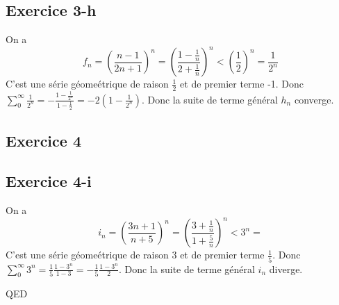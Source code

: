 \documentclass[]{book}
\theoremstyle{definition}
\begin{document}
\subsection*{Exercice 3-h}
On a 
$$f_n = \left( \frac{n-1}{2n+1} \right)^n = \left( \frac{1-\frac{1}{n}}{2+\frac{1}{n}} \right)^n < \left( \frac{1}{2} \right)^n = \frac{1}{2^n}$$
C'est une s\'erie g\'eome\'etrique de raison $\frac{1}{2}$ et de premier terme -1. Donc $\sum_{0}^{\infty}\frac{1}{2^n} = -\frac{1-\frac{1}{2^n}}{1-\frac{1}{2}} = -2(1-\frac{1}{2^n})$. Donc la suite de terme g\'en\'eral $h_n$ converge.

\subsection*{Exercice 4}
\subsection*{Exercice 4-i}
On a 
$$i_n = \left( \frac{3n+1}{n+5} \right)^n = \left( \frac{3+\frac{1}{n}}{1+\frac{5}{n}} \right)^n < 3^n = $$
C'est une s\'erie g\'eome\'etrique de raison $3$ et de premier terme $\frac{1}{5}$. Donc $\sum_{0}^{\infty} 3^n = \frac{1}{5}\frac{1-3^n}{1-3} = -\frac{1}{5}\frac{1-3^n}{2}$. Donc la suite de terme g\'en\'eral $i_n$ diverge.


QED
\end{document}
